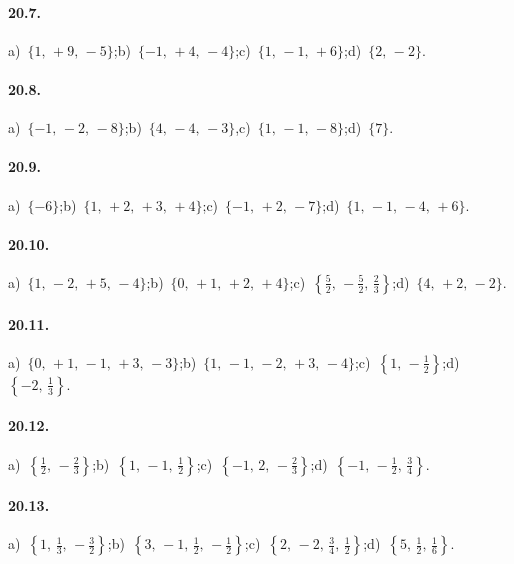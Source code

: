 \begin{multicols}{2}
\paragraph{20.7.}
a)~$\{1\text{,~}+9\text{,~}-5\}$;\quad b)~$\{-1\text{,~}+4\text{,~}-4\}$;\quad c)~$\{1\text{,~}-1\text{,~}+6\}$;\quad d)~$\{2\text{,~}-2\}$.
\paragraph{20.8.}
a)~$\{-1\text{,~}-2\text{,~}-8\}$;\quad b)~$\{4\text{,~}-4\text{,~}-3\}$,\quad c)~$\{1\text{,~}-1\text{,~}-8\}$;\quad d)~$\{7\}$.
\paragraph{20.9.}
a)~$\{-6\}$;\quad b)~$\{1\text{,~}+2\text{,~}+3\text{,~}+4\}$;\quad c)~$\{-1\text{,~}+2\text{,~}-7\}$;\quad d)~$\{1\text{,~}-1\text{,~}-4\text{,~}+6\}$.

\paragraph{20.10.}
a)~$\{1\text{,~}-2\text{,~}+5\text{,~}-4\}$;\quad b)~$\{0\text{,~}+1\text{,~}+2\text{,~}+4\}$;\quad c)~$\left\{\frac{5}{2}\text{,~}-\frac{5}{2}\text{,~}\frac{2}{3}\right\}$;\quad d)~$\{4\text{,~}+2\text{,~}-2\}$.

\paragraph{20.11.}
a)~$\{0\text{,~}+1\text{,~}-1\text{,~}+3\text{,~}-3\}$;\quad b)~$\{1\text{,~}-1\text{,~}-2\text{,~}+3\text{,~}-4\}$;\quad c)~$\left\{1\text{,~}-\frac{1}{2}\right\}$;\quad d)~$\left\{-2\text{,~}\frac{1}{3}\right\}$.

\paragraph{20.12.}
a)~$\left\{\frac{1}{2}\text{,~}-\frac{2}{3}\right\}$;\quad b)~$\left\{1\text{,~}-1\text{,~}\frac{1}{2}\right\}$;\quad c)~$\left\{-1\text{,~}2\text{,~}-\frac{2}{3}\right\}$;\quad d)~$\left\{-1\text{,~}-\frac{1}{2}\text{,~}\frac{3}{4}\right\}$.

\paragraph{20.13.}
a)~$\left\{1\text{,~}\frac{1}{3}\text{,~}-\frac{3}{2}\right\}$;\quad b)~$\left\{3\text{,~}-1\text{,~}\frac{1}{2}\text{,~}-\frac{1}{2}\right\}$;\quad c)~$\left\{2\text{,~}-2\text{,~}\frac{3}{4}\text{,~}\frac{1}{2}\right\}$;\quad d)~$\left\{5\text{,~}\frac{1}{2}\text{,~}\frac{1}{6}\right\}$.


\end{multicols}
